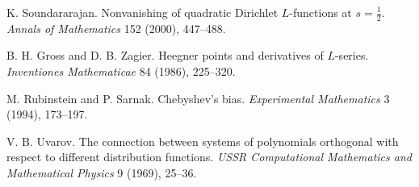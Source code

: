 K. Soundararajan. Nonvanishing of quadratic Dirichlet $L$-functions at $s=\frac12$. \emph{Annals of Mathematics} 152 (2000), 447--488.

 B. H. Gross and D. B. Zagier. Heegner points and derivatives of $L$-series. \emph{Inventiones Mathematicae} 84 (1986), 225--320.

 M. Rubinstein and P. Sarnak. Chebyshev's bias. \emph{Experimental Mathematics} 3 (1994), 173--197.

 V. B. Uvarov. The connection between systems of polynomials orthogonal with respect to different distribution functions. \emph{USSR Computational Mathematics and Mathematical Physics} 9 (1969), 25--36.
